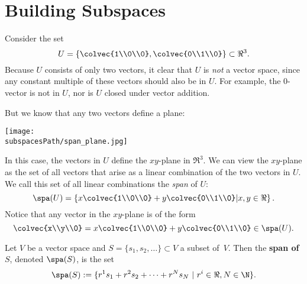 

\section{Building Subspaces}

Consider the set 
\[
U= \left\{ \colvec{1\\0\\0}, \colvec{0\\1\\0} \right\} \subset \Re^3.
\]
Because $U$ consists of only two vectors, it clear that $U$ is \emph{not} a vector space, since any constant multiple of these vectors should also be in $U$.  For example, the $0$-vector is not in $U$, nor is $U$ closed under vector addition.

But we know that any two vectors define a plane:
\begin{center}
\texttt{[image: \\subspacesPath/span\_plane.jpg]}
\end{center}
 In this case, the vectors in $U$ define the $xy$-plane in $\Re^3$.  We can view the $xy$-plane as the set of all vectors that arise as a linear combination of the two vectors in $U$.  We call this set of all linear combinations the \emph{span} of $U$:
\[
\spa(U)=\left\{ x \colvec{1\\0\\0}+y \colvec{0\\1\\0} \middle| x,y\in \Re \right\}.
\]
Notice that any vector in the $xy$-plane is of the form
\[
\colvec{x\\y\\0} = x \colvec{1\\0\\0}+y \colvec{0\\1\\0} \in \spa(U).
\]

\begin{definition}
Let $V$ be a vector space and $S=\{ s_1, s_2, \ldots \} \subset V$ a subset of~$V$.  Then the {\bfseries span of $S$}, denoted $\spa(S)$, is the set
\[
\spa(S):=\{ r^1s_1+r^2s_2+\cdots + r^Ns_N ~|~ r^i\in \Re, N\in \N \}.
\]
\end{definition}

